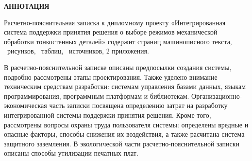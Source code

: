 \documentclass[14pt,oneside,final]{extreport}
\begin{document}
 	\begin{titlepage}
 		\begin{center}
 			\textbf{АННОТАЦИЯ}
 		\end{center}
 		
	Расчетно-пояснительная записка к дипломному проекту «Интегрированная система поддержки принятия решения о выборе режимов механической обработки тонкостенных деталей» содержит \pageref{LastPage} страниц машинописного текста, \totalfigures\ рисунков, \totaltables\ таблиц,  	\ источников, 2 приложения.
	
	В расчетно-пояснительной записке описаны предпосылки создания системы, подробно рассмотрены этапы проектирования. Также уделено внимание техническим средствам разработки: системам управления базами данных, языкам программирования, программным платформам и библиотекам. Организационно-экономическая часть записки посвящена определению затрат на разработку интегрированной системы поддержки принятия решения. Кроме того, рассмотрены вопросы охраны труда пользователя системы: определены вредные и опасные факторы, способы снижения их воздействия, а также расчитана система защитного заземления. В экологической части расчетно-пояснительной записки описаны способы утилизации печатных плат.

	\thispagestyle{empty}
 	\end{titlepage}
 
\end{document}

